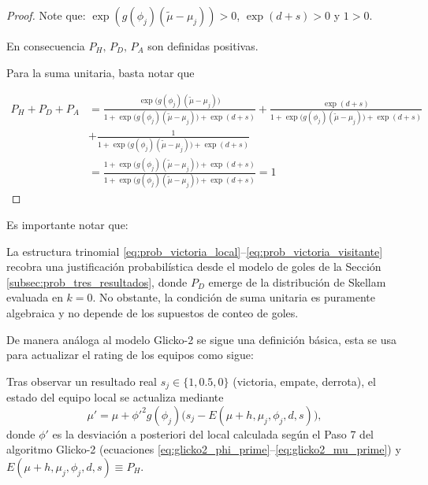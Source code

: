 \begin{proof}
	
	Note que: $\exp(g(\phi_j)(\tilde{\mu}-\mu_j))>0$, $\exp(d+s)>0$ y $1>0$.
	
	En consecuencia $P_H\text{, }P_D\text{, }P_A$ son definidas positivas.
	
	Para la suma unitaria, basta notar que
	
	\begin{align*}
		P_H + P_D + P_A &= \frac{\exp\bigl(g(\phi_j)(\tilde{\mu} - \mu_j)\bigr)}{1 + \exp\bigl(g(\phi_j)(\tilde{\mu} - \mu_j)\bigr) + \exp(d+s)} + \frac{\exp(d+s)}{1 + \exp\bigl(g(\phi_j)(\tilde{\mu} - \mu_j)\bigr) + \exp(d+s)} \\
		&+ \frac{1}{1 + \exp\bigl(g(\phi_j)(\tilde{\mu} - \mu_j)\bigr) + \exp(d+s)}\\
		&= \frac{1+\exp\bigl(g(\phi_j)(\tilde{\mu}-\mu_j)\bigr)+\exp(d+s)}{1 + \exp\bigl(g(\phi_j)(\tilde{\mu} - \mu_j)\bigr) + \exp(d+s)} = 1
	\end{align*}
\end{proof}

Es importante notar que:

\begin{obs}
	La estructura trinomial \eqref{eq:prob_victoria_local}--\eqref{eq:prob_victoria_visitante} recobra una justificaci\'on probabil\'istica desde el modelo de goles de la Secci\'on \ref{subsec:prob_tres_resultados}, donde $P_D$ emerge de la distribuci\'on de Skellam evaluada en $k=0$. No obstante, la condici\'on de suma unitaria es puramente algebraica y no depende de los supuestos de conteo de goles.
\end{obs}

De manera an\'aloga al modelo Glicko-2 se sigue una definici\'on b\'asica, esta se usa para actualizar el rating de los equipos como sigue:

\begin{definition}
	\label{def:update_local}
	Tras observar un resultado real $s_j \in \{1, 0{.}5, 0\}$ (victoria, empate, derrota), el estado del equipo local se actualiza mediante
	\begin{equation}
		\label{eq:update_localia}
		\mu' = \mu + \phi'^2 g(\phi_j)\bigl(s_j - E(\mu+h, \mu_j, \phi_j, d, s)\bigr),
	\end{equation}
	donde $\phi'$ es la desviaci\'on a posteriori del local calculada seg\'un el Paso 7 del algoritmo Glicko-2 (ecuaciones \eqref{eq:glicko2_phi_prime}--\eqref{eq:glicko2_mu_prime}) y $E(\mu+h, \mu_j, \phi_j, d, s) \equiv P_H$.
\end{definition}

